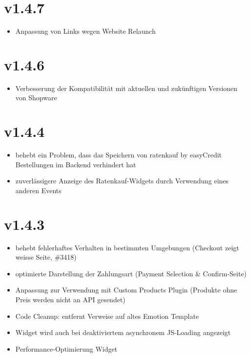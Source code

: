 \documentclass[a4paper,10pt,openany,oneside,ngerman]{sphinxmanual}
\begin{document}
\section{v1.4.7}
\label{\detokenize{changelog:v1-4-7}}\begin{itemize}
\item {} 
Anpassung von Links wegen Website Relaunch

\end{itemize}


\section{v1.4.6}
\label{\detokenize{changelog:v1-4-6}}\begin{itemize}
\item {} 
Verbesserung der Kompatibilität mit aktuellen und zukünftigen Versionen von Shopware

\end{itemize}


\section{v1.4.4}
\label{\detokenize{changelog:v1-4-4}}\begin{itemize}
\item {} 
behebt ein Problem, dass das Speichern von ratenkauf by easyCredit Bestellungen im Backend verhindert hat

\item {} 
zuverlässigere Anzeige des Ratenkauf-Widgets durch Verwendung eines anderen Events

\end{itemize}


\section{v1.4.3}
\label{\detokenize{changelog:v1-4-3}}\begin{itemize}
\item {} 
behebt fehlerhaftes Verhalten in bestimmten Umgebungen (Checkout zeigt weisse Seite, \#3418)

\item {} 
optimierte Darstellung der Zahlungsart (Payment Selection \& Confirm-Seite)

\item {} 
Anpassung zur Verwendung mit Custom Products Plugin (Produkte ohne Preis werden nicht an API gesendet)

\item {} 
Code Cleanup: entfernt Verweise auf altes Emotion Template

\item {} 
Widget wird auch bei deaktiviertem asynchronem JS-Loading angezeigt

\item {} 
Performance-Optimierung Widget

\end{itemize}
\end{document}

